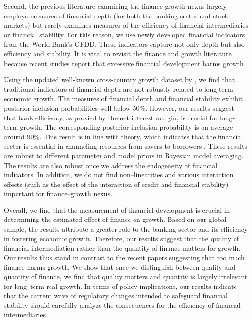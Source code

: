 Second, the previous literature examining the finance-growth nexus largely employs measures of financial depth (for both the banking sector and stock markets) but rarely examines measures of the efficiency of financial intermediaries or financial stability. For this reason, we use newly developed financial indicators from the World Bank's \ac{GFDD}. These indicators capture not only depth but also efficiency and stability. It is vital to revisit the finance and growth literature because recent studies report that excessive financial development harms growth \citep{CecchettiKharroubi2012}.

Using the updated well-known cross-country growth dataset by \citet{Fernandezetal2001}, we find that traditional indicators of financial depth are not robustly related to long-term economic growth. The measures of financial depth and financial stability exhibit posterior inclusion probabilities well below 50\%. However, our results suggest that bank efficiency, as proxied by the net interest margin, is crucial for long-term growth. The corresponding posterior inclusion probability is on average around 90\%. This result is in line with theory, which indicates that the financial sector is essential in channeling resources from savers to borrowers \citet{Pagano1993}. These results are robust to different parameter and model priors in Bayesian model averaging. The results are also robust once we address the endogeneity of financial indicators. In addition, we do not find non--linearities and various interaction effects (such as the effect of the interaction of credit and financial stability) important for finance--growth nexus. 

Overall, we find that the measurement of financial development is crucial in determining the estimated effect of finance on growth. Based on our global sample, the results attribute a greater role to the banking sector and its efficiency in fostering economic growth. Therefore, our results suggest that the quality of financial intermediation rather than the quantity of finance matters for growth. Our results thus stand in contrast to the recent papers suggesting that too much finance harms growth. We show that once we distinguish between quality and quantity of finance, we find that quality matters and quantity is largely irrelevant for long--term real growth. In terms of policy implications, our results indicate that the current wave of regulatory changes intended to safeguard financial stability should carefully analyze the consequences for the efficiency of financial intermediaries.

